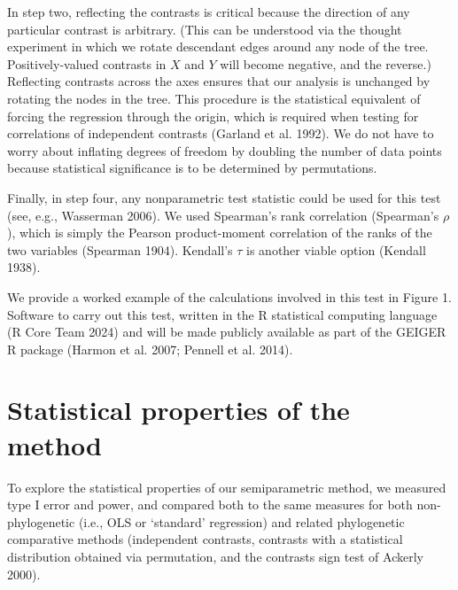 \documentclass[fleqn,10pt,lineno]{wlpeerj} %
\begin{document}
In step two, reflecting the contrasts is critical because the direction of any particular contrast is arbitrary. (This can be understood via the thought experiment in which we rotate descendant edges around any node of the tree. Positively-valued contrasts in \(X\) and \(Y\) will become negative, and the reverse.) Reflecting contrasts across the axes ensures that our analysis is unchanged by rotating the nodes in the tree. This procedure is the statistical equivalent of forcing the regression through the origin, which is required when testing for correlations of independent contrasts (Garland et al. 1992). We do not have to worry about inflating degrees of freedom by doubling the number of data points because statistical significance is to be determined by permutations.

Finally, in step four, any nonparametric test statistic could be used for this test (see, e.g., Wasserman 2006). We used Spearman's rank correlation (Spearman's \(\rho\)), which is simply the Pearson product-moment correlation of the ranks of the two variables (Spearman 1904). Kendall's \(\tau\) is another viable option (Kendall 1938).

We provide a worked example of the calculations involved in this test in Figure 1. Software to carry out this test, written in the R statistical computing language (R Core Team 2024) and will be made publicly available as part of the GEIGER R package (Harmon et al. 2007; Pennell et al. 2014).

\section{Statistical properties of the method}\label{statistical-properties-of-the-method}

To explore the statistical properties of our semiparametric method, we measured type I error and power, and compared both to the same measures for both non-phylogenetic (i.e., OLS or `standard' regression) and related phylogenetic comparative methods (independent contrasts, contrasts with a statistical distribution obtained via permutation, and the contrasts sign test of Ackerly 2000).
\end{document}
